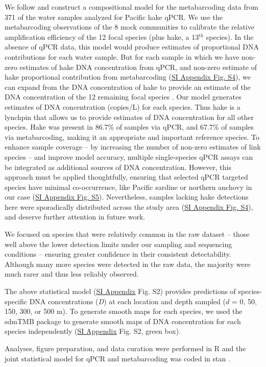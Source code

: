\documentclass{article}
\begin{document}
We follow \cite{shelton2023} and construct a compositional model for the metabarcoding data from 371 of the water samples analyzed for Pacific hake qPCR. We use the metabarcoding observations of the 8 mock communities to calibrate the relative amplification efficiency of the 12 focal species (plus hake, a 13$^{th}$ species). In the absence of qPCR data, this model would produce estimates of proportional DNA contributions for each water sample. But for each sample in which we have non-zero estimates of hake DNA concentration from qPCR, and non-zero estimate of hake proportional contribution from metabarcoding (\href{SI_Appendix.pdf}{SI Appendix Fig. S4}), we can expand from the DNA concentration of hake to provide an estimate of the DNA concentration of the 12 remaining focal species \cite{allan2023}. Our model generates estimates of DNA concentration (copies/L) for each species. Thus hake is a lynchpin that allows us to provide estimates of DNA concentration for all other species. Hake was present in 86.7\% of samples via qPCR, and 67.7\% of samples via metabarcoding, making it an appropriate and important reference species. To enhance sample coverage -- by increasing the number of non-zero estimates of link species -- and improve model accuracy, multiple single-species qPCR assays can be integrated as additional sources of DNA concentration. However, this approach must be applied thoughtfully, ensuring that selected qPCR targeted species have minimal co-occurrence, like Pacific sardine or northern anchovy in our case (\href{SI_Appendix.pdf}{SI Appendix Fig. S5}). Nevertheless, samples lacking hake detections here were sporadically distributed across the study area (\href{SI_Appendix.pdf}{SI Appendix Fig. S4}), and deserve further attention in future work.

We focused on species that were relatively common in the raw dataset – those well above the lower detection limits under our sampling and sequencing conditions – ensuring greater confidence in their consistent detectability. Although many more species were detected in the raw data, the majority were much rarer and thus less reliably observed.

The above statistical model (\href{SI_Appendix.pdf}{SI Appendix} Fig. S2) provides predictions of species-specific DNA concentrations (\textit{D}) at each location and depth sampled ($d$ = 0, 50, 150, 300, or 500 m). To generate smooth maps for each species, we used the sdmTMB package \cite{anderson2022} to generate smooth maps of DNA concentration for each species independently (\href{SI_Appendix.pdf}{SI Appendix} Fig. S2, green box). 


Analyses, figure preparation, and data curation were performed in R \cite{rcoreteam2024} and the joint statistical model for qPCR and metabarcoding was coded in stan \cite{standevelopmentteam2023}.


\end{document}
